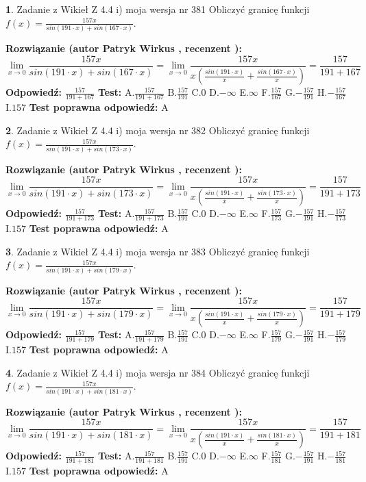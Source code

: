 \documentclass[12pt, a4paper]{article}
\theoremstyle{definition} %
\newtheorem{zad}{}
\newcommand{\zadStart}[1]{\begin{zad}#1\newline}
\newcommand{\zadStop}{\end{zad}}
\newcommand{\rozwStart}[2]{\noindent \textbf{Rozwiązanie (autor #1 , recenzent #2): }\newline}
\newcommand{\rozwStop}{\newline}
\newcommand{\odpStart}{\noindent \textbf{Odpowiedź:}\newline}
\newcommand{\odpStop}{\newline}
\newcommand{\testStart}{\noindent \textbf{Test:}\newline}
\newcommand{\testStop}{\newline}
\newcommand{\kluczStart}{\noindent \textbf{Test poprawna odpowiedź:}\newline}
\newcommand{\kluczStop}{\newline}
\begin{document}
\zadStart{Zadanie z Wikieł Z 4.4 i) moja wersja nr 381}
Obliczyć granicę funkcji $f(x)=\frac{157x}{sin(191\cdot x) +sin(167\cdot x)}$.
\zadStop
\rozwStart{Patryk Wirkus}{}
$$\lim\limits_{x\to 0}\frac{157x}{sin(191\cdot x) +sin(167\cdot x)}=\lim\limits_{x\to 0}\frac{157x}{x(\frac{sin(191\cdot x)}{x}+\frac{sin(167\cdot x)}{x})}=\frac{157}{191+167}$$
\rozwStop
\odpStart
$\frac{157}{191+167}$
\odpStop
\testStart
A.$\frac{157}{191+167}$
B.$\frac{157}{191}$
C.$0$
D.$-\infty$
E.$\infty$
F.$\frac{157}{167}$
G.$-\frac{157}{191}$
H.$-\frac{157}{167}$
I.$157$
\testStop
\kluczStart
A
\kluczStop



\zadStart{Zadanie z Wikieł Z 4.4 i) moja wersja nr 382}
Obliczyć granicę funkcji $f(x)=\frac{157x}{sin(191\cdot x) +sin(173\cdot x)}$.
\zadStop
\rozwStart{Patryk Wirkus}{}
$$\lim\limits_{x\to 0}\frac{157x}{sin(191\cdot x) +sin(173\cdot x)}=\lim\limits_{x\to 0}\frac{157x}{x(\frac{sin(191\cdot x)}{x}+\frac{sin(173\cdot x)}{x})}=\frac{157}{191+173}$$
\rozwStop
\odpStart
$\frac{157}{191+173}$
\odpStop
\testStart
A.$\frac{157}{191+173}$
B.$\frac{157}{191}$
C.$0$
D.$-\infty$
E.$\infty$
F.$\frac{157}{173}$
G.$-\frac{157}{191}$
H.$-\frac{157}{173}$
I.$157$
\testStop
\kluczStart
A
\kluczStop



\zadStart{Zadanie z Wikieł Z 4.4 i) moja wersja nr 383}
Obliczyć granicę funkcji $f(x)=\frac{157x}{sin(191\cdot x) +sin(179\cdot x)}$.
\zadStop
\rozwStart{Patryk Wirkus}{}
$$\lim\limits_{x\to 0}\frac{157x}{sin(191\cdot x) +sin(179\cdot x)}=\lim\limits_{x\to 0}\frac{157x}{x(\frac{sin(191\cdot x)}{x}+\frac{sin(179\cdot x)}{x})}=\frac{157}{191+179}$$
\rozwStop
\odpStart
$\frac{157}{191+179}$
\odpStop
\testStart
A.$\frac{157}{191+179}$
B.$\frac{157}{191}$
C.$0$
D.$-\infty$
E.$\infty$
F.$\frac{157}{179}$
G.$-\frac{157}{191}$
H.$-\frac{157}{179}$
I.$157$
\testStop
\kluczStart
A
\kluczStop



\zadStart{Zadanie z Wikieł Z 4.4 i) moja wersja nr 384}
Obliczyć granicę funkcji $f(x)=\frac{157x}{sin(191\cdot x) +sin(181\cdot x)}$.
\zadStop
\rozwStart{Patryk Wirkus}{}
$$\lim\limits_{x\to 0}\frac{157x}{sin(191\cdot x) +sin(181\cdot x)}=\lim\limits_{x\to 0}\frac{157x}{x(\frac{sin(191\cdot x)}{x}+\frac{sin(181\cdot x)}{x})}=\frac{157}{191+181}$$
\rozwStop
\odpStart
$\frac{157}{191+181}$
\odpStop
\testStart
A.$\frac{157}{191+181}$
B.$\frac{157}{191}$
C.$0$
D.$-\infty$
E.$\infty$
F.$\frac{157}{181}$
G.$-\frac{157}{191}$
H.$-\frac{157}{181}$
I.$157$
\testStop
\kluczStart
A
\kluczStop
\end{document}
